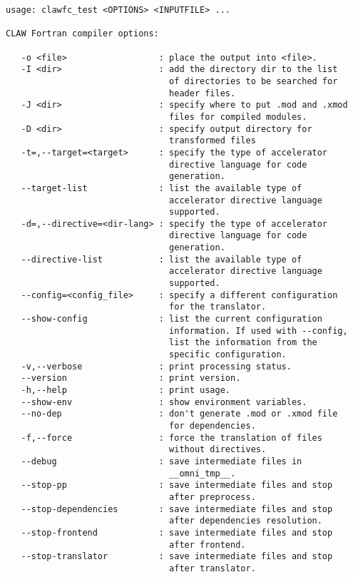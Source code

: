 \documentclass{article}
\begin{document}
\begin{lstlisting}
usage: clawfc_test <OPTIONS> <INPUTFILE> ...

CLAW Fortran compiler options:

   -o <file>                  : place the output into <file>.
   -I <dir>                   : add the directory dir to the list 
                                of directories to be searched for 
                                header files.
   -J <dir>                   : specify where to put .mod and .xmod 
                                files for compiled modules.
   -D <dir>                   : specify output directory for 
                                transformed files
   -t=,--target=<target>      : specify the type of accelerator 
                                directive language for code 
                                generation.
   --target-list              : list the available type of 
                                accelerator directive language 
                                supported.
   -d=,--directive=<dir-lang> : specify the type of accelerator 
                                directive language for code 
                                generation.
   --directive-list           : list the available type of 
                                accelerator directive language 
                                supported.
   --config=<config_file>     : specify a different configuration 
                                for the translator.
   --show-config              : list the current configuration 
                                information. If used with --config, 
                                list the information from the 
                                specific configuration.
   -v,--verbose               : print processing status.
   --version                  : print version.
   -h,--help                  : print usage.
   --show-env                 : show environment variables.
   --no-dep                   : don't generate .mod or .xmod file 
                                for dependencies.
   -f,--force                 : force the translation of files 
                                without directives.
   --debug                    : save intermediate files in 
                                __omni_tmp__.
   --stop-pp                  : save intermediate files and stop 
                                after preprocess.
   --stop-dependencies        : save intermediate files and stop 
                                after dependencies resolution.
   --stop-frontend            : save intermediate files and stop 
                                after frontend.
   --stop-translator          : save intermediate files and stop 
                                after translator.


\end{lstlisting}
\end{document}

